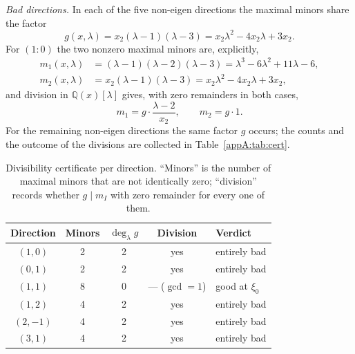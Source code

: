 \emph{Bad directions.} In each of the five non-eigen directions the maximal minors share the factor
\begin{equation}\label{appA:eq:g}
g(x,\lambda)=x_2(\lambda-1)(\lambda-3)=x_2\lambda^2-4x_2\lambda+3x_2 .
\end{equation}
For $(1\!:\!0)$ the two nonzero maximal minors are, explicitly,
\begin{align}
m_1(x,\lambda)&=(\lambda-1)(\lambda-2)(\lambda-3)=\lambda^3-6\lambda^2+11\lambda-6,
\label{appA:eq:m1}\\
m_2(x,\lambda)&=x_2(\lambda-1)(\lambda-3)=x_2\lambda^2-4x_2\lambda+3x_2,
\label{appA:eq:m2}
\end{align}
and division in $\mathbb Q(x)[\lambda]$ gives, with zero remainders in both cases,
\begin{equation}\label{appA:eq:divcert}
m_1=g\cdot\frac{\lambda-2}{x_2},\qquad m_2=g\cdot 1 .
\end{equation}
For the remaining non-eigen directions the same factor $g$ occurs; the counts and the outcome of the
divisions are collected in Table~\ref{appA:tab:cert}.

\begin{table}[t]
\centering
\caption{Divisibility certificate per direction. ``Minors'' is the number of maximal minors that are not
identically zero; ``division'' records whether $g\mid m_I$ with zero remainder for every one of them.}
\label{appA:tab:cert}\label{appA:tab:dirs}
\begin{tabular}{@{}c c c c l@{}}
\toprule
Direction & Minors & $\deg_\lambda g$ & Division & Verdict \\
\midrule
$(1,0)$  & 2 & 2 & yes & entirely bad \\
$(0,1)$  & 2 & 2 & yes & entirely bad \\
$(1,1)$  & 8 & 0 & --- ($\gcd=1$) & good at $\xi_0$ \\
$(1,2)$  & 4 & 2 & yes & entirely bad \\
$(2,-1)$ & 4 & 2 & yes & entirely bad \\
$(3,1)$  & 4 & 2 & yes & entirely bad \\
\bottomrule
\end{tabular}
\end{table}

